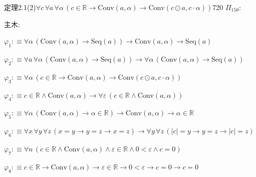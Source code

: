 \begin{fullproof}{定理2.1(2)}{$\forall c\,\forall a\,\forall \alpha\,(c \in \mathbb{R} \to \mathrm{Conv}(a,\alpha) \to \mathrm{Conv}(c \odot a,c \cdot \alpha))$}{720}
\noindent$\Pi_{150}$:
\begin{ptree}
\noLine
{}
\noLine
{}
\noLine
{}
\end{ptree}
\noindent 主木:
\begin{ptree}
\noLine
{}
\noLine
{}
\end{ptree}
\begin{abbrevlist}
\item $\varphi_{1} :\equiv \forall \alpha\,(\mathrm{Conv}(a,\alpha) \to \mathrm{Seq}(a)) \to \mathrm{Conv}(a,\alpha) \to \mathrm{Seq}(a)$
\item $\varphi_{2} :\equiv \forall a\,\forall \alpha\,(\mathrm{Conv}(a,\alpha) \to \mathrm{Seq}(a)) \to \forall \alpha\,(\mathrm{Conv}(a,\alpha) \to \mathrm{Seq}(a))$
\item $\varphi_{3} :\equiv \forall \alpha\,(c \in \mathbb{R} \to \mathrm{Conv}(a,\alpha) \to \mathrm{Conv}(c \odot a,c \cdot \alpha))$
\item $\varphi_{4} :\equiv c \in \mathbb{R} \land \mathrm{Conv}(a,\alpha) \to \forall \varepsilon\,(c \in \mathbb{R} \land \mathrm{Conv}(a,\alpha))$
\item $\varphi_{5} :\equiv \forall \alpha\,(\mathrm{Conv}(a,\alpha) \to \alpha \in \mathbb{R}) \to \mathrm{Conv}(a,\alpha) \to \alpha \in \mathbb{R}$
\item $\varphi_{6} :\equiv \forall x\,\forall y\,\forall z\,(x = y \to y = z \to x = z) \to \forall y\,\forall z\,(\lvert c \rvert = y \to y = z \to \lvert c \rvert = z)$
\item $\varphi_{7} :\equiv \forall n\,(c \in \mathbb{R} \land \mathrm{Conv}(a,\alpha) \land \varepsilon \in \mathbb{R} \land 0 < \varepsilon \land c = 0)$
\item $\varphi_{8} :\equiv c \in \mathbb{R} \to \mathrm{Conv}(a,\alpha) \to \varepsilon \in \mathbb{R} \to 0 < \varepsilon \to c = 0 \to c = 0$

\end{abbrevlist}
\end{fullproof}
